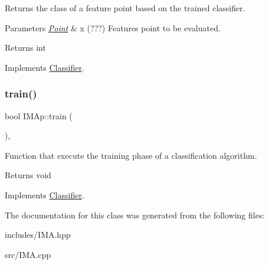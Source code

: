 Returns the class of a feature point based on the trained classifier. 


\begin{DoxyParams}{Parameters}
{\em \hyperlink{class_point}{Point}} & x (???) Features point to be evaluated. \\
\hline
\end{DoxyParams}
\begin{DoxyReturn}{Returns}
int 
\end{DoxyReturn}


Implements \hyperlink{class_classifier_ae8e9554823b85ddc2dcad2955da811d9}{Classifier}.

\mbox{\label{class_i_m_ap_a0d9fc6d772e27882ce77902c44a91ddb}} 
\subsubsection{\texorpdfstring{train()}{train()}}
{\footnotesize\ttfamily bool I\+M\+Ap\+::train (\begin{DoxyParamCaption}{ }\end{DoxyParamCaption})\hspace{0.3cm}{\ttfamily [override]}, {\ttfamily [virtual]}}



Function that execute the training phase of a classification algorithm. 

\begin{DoxyReturn}{Returns}
void 
\end{DoxyReturn}


Implements \hyperlink{class_classifier_a2306a5de27555ab093593ac9642bc7d9}{Classifier}.



The documentation for this class was generated from the following files\+:\begin{DoxyCompactItemize}
\item 
includes/I\+M\+A.\+hpp\item 
src/I\+M\+A.\+cpp\end{DoxyCompactItemize}
